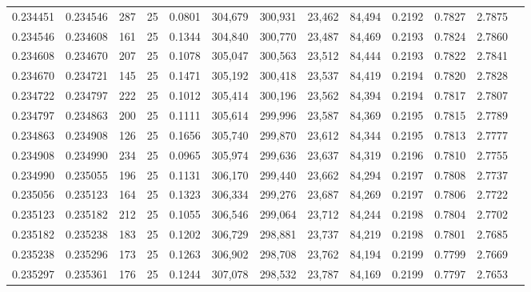 \begin{tabular}{rrrrrrrrrrrrr}
0.234451 & 0.234546 &   287 &  25 &                                     0.0801 & 304,679 & 300,931 &  23,462 &  84,494 & 0.2192 & 0.7827 & 2.7875 \\
0.234546 & 0.234608 &   161 &  25 &                                     0.1344 & 304,840 & 300,770 &  23,487 &  84,469 & 0.2193 & 0.7824 & 2.7860 \\
0.234608 & 0.234670 &   207 &  25 &                                     0.1078 & 305,047 & 300,563 &  23,512 &  84,444 & 0.2193 & 0.7822 & 2.7841 \\
0.234670 & 0.234721 &   145 &  25 &                                     0.1471 & 305,192 & 300,418 &  23,537 &  84,419 & 0.2194 & 0.7820 & 2.7828 \\
0.234722 & 0.234797 &   222 &  25 &                                     0.1012 & 305,414 & 300,196 &  23,562 &  84,394 & 0.2194 & 0.7817 & 2.7807 \\
0.234797 & 0.234863 &   200 &  25 &                                     0.1111 & 305,614 & 299,996 &  23,587 &  84,369 & 0.2195 & 0.7815 & 2.7789 \\
0.234863 & 0.234908 &   126 &  25 &                                     0.1656 & 305,740 & 299,870 &  23,612 &  84,344 & 0.2195 & 0.7813 & 2.7777 \\
0.234908 & 0.234990 &   234 &  25 &                                     0.0965 & 305,974 & 299,636 &  23,637 &  84,319 & 0.2196 & 0.7810 & 2.7755 \\
0.234990 & 0.235055 &   196 &  25 &                                     0.1131 & 306,170 & 299,440 &  23,662 &  84,294 & 0.2197 & 0.7808 & 2.7737 \\
0.235056 & 0.235123 &   164 &  25 &                                     0.1323 & 306,334 & 299,276 &  23,687 &  84,269 & 0.2197 & 0.7806 & 2.7722 \\
0.235123 & 0.235182 &   212 &  25 &                                     0.1055 & 306,546 & 299,064 &  23,712 &  84,244 & 0.2198 & 0.7804 & 2.7702 \\
0.235182 & 0.235238 &   183 &  25 &                                     0.1202 & 306,729 & 298,881 &  23,737 &  84,219 & 0.2198 & 0.7801 & 2.7685 \\
0.235238 & 0.235296 &   173 &  25 &                                     0.1263 & 306,902 & 298,708 &  23,762 &  84,194 & 0.2199 & 0.7799 & 2.7669 \\
0.235297 & 0.235361 &   176 &  25 &                                     0.1244 & 307,078 & 298,532 &  23,787 &  84,169 & 0.2199 & 0.7797 & 2.7653 \\

\end{tabular}
